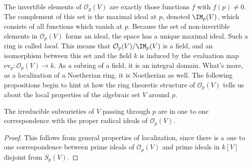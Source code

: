 



The invertible elements of $\mathcal{O}_p(V)$ are exactly those functions $f$ with $f(p) \neq 0$. The complement of this set is the maximal ideal at $p$, denoted $\IM_p(V)$, which consists of all functions which vanish at $p$. Because the set of non-invertible elements in $\mathcal{O}_p(V)$ forms an ideal, the space has a unique maximal ideal. Such a ring is called \emph{local}. This means that $\mathcal{O}_p(V)/\IM_p(V)$ is a field, and an isomorphism between this set and the field $k$ is induced by the evaluation map $\text{ev}_p: \mathcal{O}_p(V) \to k$. As a subring of a field, it is an integral domain. What's more, as a localization of a Noetherian ring, it is Noetherian as well. The following propositions begin to hint at how the ring theoretic structure of $\mathcal{O}_p(V)$ tells us about the local properties of the algebraic set $V$ around $p$.

\begin{prop}
    The irreducible subvarieties of $V$ passing through $p$ are in one to one correspondence with the proper radical ideals of $\mathcal{O}_p(V)$.
\end{prop}
\begin{proof}
    This follows from general properties of localization, since there is a one to one correspondence between prime ideals of $\mathcal{O}_p(V)$ and prime ideals in $k[V]$ disjoint from $S_p(V)$.
\end{proof}

